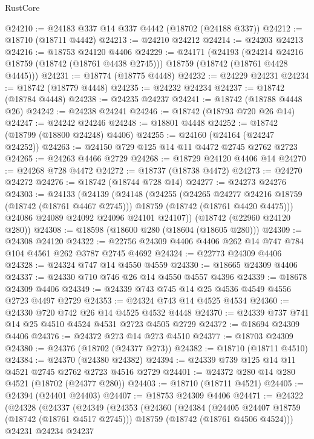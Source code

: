 \begin{lexlean}{RustCore}
\begin{coremodule}
@24210 := @24183 @337 @14 @337 @4442 (@18702 (@24188 @337))
@24212 := @18710 (@18711 @4442)
@24213 := @24210 @24212
@24214 := @24203 @24213
@24216 := @18753 @24120 @4406
@24229 := @24171
    (@24193
      (@24214 @24216 @18759 (@18742 (@18761 @4438 @2745)))
      @18759
      (@18742 (@18761 @4428 @4445)))
@24231 := @18774 (@18775 @4448)
@24232 := @24229 @24231
@24234 := @18742 (@18779 @4448)
@24235 := @24232 @24234
@24237 := @18742 (@18784 @4448)
@24238 := @24235 @24237
@24241 := @18742 (@18788 @4448 @26)
@24242 := @24238 @24241
@24246 := @18742 (@18793 @720 @26 @14)
@24247 := @24242 @24246
@24248 := @18801 @4448
@24252 := @18742 (@18799 (@18800 @24248) @4406)
@24255 := @24160 (@24164 (@24247 @24252))
@24263 := @24150 @729 @125 @14 @11 @4472 @2745 @2762 @2723
@24265 := @24263 @4466 @2729
@24268 := @18729 @24120 @4406 @14
@24270 := @24268 @728 @4472
@24272 := @18737 (@18738 @4472)
@24273 := @24270 @24272
@24276 := @18742 (@18744 @728 @14)
@24277 := @24273 @24276
@24303 := @24133
    (@24139
      (@24148
        (@24255
          (@24265 @24277 @24216 @18759 (@18742 (@18761 @4467 @2745)))
          @18759
          (@18742 (@18761 @4420 @4475)))
        @24086
        @24089
        @24092
        @24096
        @24101
        @24107))
    (@18742 (@22960 @24120 @280))
@24308 := @18598 (@18600 @280 (@18604 (@18605 @280)))
@24309 := @24308 @24120
@24322 := @22756 @24309 @4406 @4406 @262 @14 @747 @784 @104 @4561 @262 @3787 @2745 @4692
@24324 := @22773 @24309 @4406
@24328 := @24324 @747 @14 @4550 @4559
@24330 := @18665 @24309 @4406
@24337 := @24330 @710 @746 @26 @14 @4550 @4557 @4396
@24339 := @18678 @24309 @4406
@24349 := @24339 @743 @745 @14 @25 @4536 @4549 @4556 @2723 @4497 @2729
@24353 := @24324 @743 @14 @4525 @4534
@24360 := @24330 @720 @742 @26 @14 @4525 @4532 @4448
@24370 := @24339 @737 @741 @14 @25 @4510 @4524 @4531 @2723 @4505 @2729
@24372 := @18694 @24309 @4406
@24376 := @24372 @273 @14 @273 @4510
@24377 := @18703 @24309
@24380 := @24376 (@18702 (@24377 @273))
@24382 := @18710 (@18711 @4510)
@24384 := @24370 (@24380 @24382)
@24394 := @24339 @739 @125 @14 @11 @4521 @2745 @2762 @2723 @4516 @2729
@24401 := @24372 @280 @14 @280 @4521 (@18702 (@24377 @280))
@24403 := @18710 (@18711 @4521)
@24405 := @24394 (@24401 @24403)
@24407 := @18753 @24309 @4406
@24471 := @24322
    (@24328
      (@24337
        (@24349
          (@24353
            (@24360
              (@24384
                (@24405 @24407 @18759 (@18742 (@18761 @4517 @2745)))
                @18759
                (@18742 (@18761 @4506 @4524)))
              @24231
              @24234
              @24237

\end{coremodule}
\end{lexlean}
